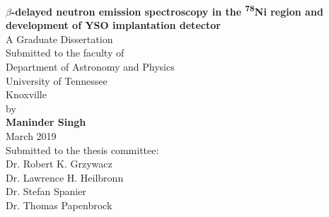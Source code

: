 \documentclass[a4paper,12pt,twoside]{report}
\begin{document}
\begin{titlepage}
   \begin{center}
       \vspace*{1cm}
      \Large{ \textbf{$\beta$-delayed neutron emission spectroscopy in the \textsuperscript{78}Ni region and development of YSO implantation detector}}\\
       \vspace{1.0cm}
 A Graduate Dissertation\\
Submitted to the faculty of\\
 \vspace{1.0cm}
       Department of Astronomy and Physics\\
       
       University of Tennessee\\

       Knoxville\\
       \vspace{1.0cm}
       by\\
       \textbf{Maninder Singh}\\
       March 2019\\
       \vspace{1.0cm}
       Submitted to the thesis committee:\\
       Dr. Robert K. Grzywacz\\
        Dr. Lawrence H. Heilbronn\\
        Dr. Stefan Spanier\\
       Dr. Thomas Papenbrock\\
      
   \end{center}
\end{titlepage}
\tableofcontents
\newpage
\listoffigures
\newpage
\end{document}
